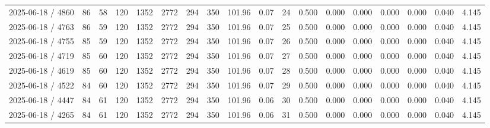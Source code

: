 \documentclass[UTF8,10pt,a4paper,fontset=fandol]{ctexart}
\begin{document}
\begin{center}
\begin{tabular}{p{1.45cm}p{0.55cm}p{0.45cm}p{0.48cm}p{0.48cm}p{0.48cm}p{0.48cm}p{0.48cm}p{0.62cm}p{0.48cm}p{0.48cm}p{0.62cm}p{0.62cm}p{0.62cm}p{0.62cm}p{0.62cm}p{0.62cm}p{0.62cm}}
2025-06-18 / 4860 & 86 & 58 & 120 & 1352 & 2772 & 294 & 350 & 101.96 & 0.07 & 24 & 0.500 & 0.000 & 0.000 & 0.000 & 0.000 & 0.040 & 4.145 \\
2025-06-18 / 4763 & 86 & 59 & 120 & 1352 & 2772 & 294 & 350 & 101.96 & 0.07 & 25 & 0.500 & 0.000 & 0.000 & 0.000 & 0.000 & 0.040 & 4.145 \\
2025-06-18 / 4755 & 85 & 59 & 120 & 1352 & 2772 & 294 & 350 & 101.96 & 0.07 & 26 & 0.500 & 0.000 & 0.000 & 0.000 & 0.000 & 0.040 & 4.145 \\
2025-06-18 / 4719 & 85 & 60 & 120 & 1352 & 2772 & 294 & 350 & 101.96 & 0.07 & 27 & 0.500 & 0.000 & 0.000 & 0.000 & 0.000 & 0.040 & 4.145 \\
2025-06-18 / 4619 & 85 & 60 & 120 & 1352 & 2772 & 294 & 350 & 101.96 & 0.07 & 28 & 0.500 & 0.000 & 0.000 & 0.000 & 0.000 & 0.040 & 4.145 \\
2025-06-18 / 4522 & 84 & 60 & 120 & 1352 & 2772 & 294 & 350 & 101.96 & 0.07 & 29 & 0.500 & 0.000 & 0.000 & 0.000 & 0.000 & 0.040 & 4.145 \\
2025-06-18 / 4447 & 84 & 61 & 120 & 1352 & 2772 & 294 & 350 & 101.96 & 0.06 & 30 & 0.500 & 0.000 & 0.000 & 0.000 & 0.000 & 0.040 & 4.145 \\
2025-06-18 / 4265 & 84 & 61 & 120 & 1352 & 2772 & 294 & 350 & 101.96 & 0.06 & 31 & 0.500 & 0.000 & 0.000 & 0.000 & 0.000 & 0.040 & 4.145 \\
\hline
\end{tabular}
\end{center}


\newpage
\end{document}
